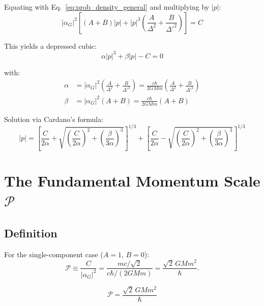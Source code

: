 \documentclass[11pt,a4paper]{article}
\theoremstyle{definition}
\theoremstyle{remark}
\begin{document}
	Equating with Eq.~\eqref{eq:prob_density_general} and multiplying by $|p|$:
	\begin{equation}
		|\alpha_G|^2\!\left[(A+B)|p| + |p|^3\!\left(\frac{A}{\Delta^2}+\frac{B}{\Delta'^2}\right)\right] = C
	\end{equation}
	
	This yields a depressed cubic:
	\begin{equation}
		\boxed{\alpha|p|^3 + \beta|p| - C = 0}
		\label{eq:cubic_momentum}
	\end{equation}
	
	with:
	\begin{align}
		\alpha &= |\alpha_G|^2\!\left(\frac{A}{\Delta^2}+\frac{B}{\Delta'^2}\right) = \frac{c\hbar}{2GMm}\!\left(\frac{A}{\Delta^2}+\frac{B}{\Delta'^2}\right) \label{eq:alpha_coeff}\\
		\beta  &= |\alpha_G|^2(A+B) = \frac{c\hbar}{2GMm}(A+B) \label{eq:beta_coeff}
	\end{align}
	
	Solution via Cardano's formula:
	\begin{equation}
		|p| = \left[\frac{C}{2\alpha}+\sqrt{\left(\frac{C}{2\alpha}\right)^2+\left(\frac{\beta}{3\alpha}\right)^3}\right]^{1/3}
		+ \left[\frac{C}{2\alpha}-\sqrt{\left(\frac{C}{2\alpha}\right)^2+\left(\frac{\beta}{3\alpha}\right)^3}\right]^{1/3}
		\label{eq:cardano_solution}
	\end{equation}
	
	\section{The Fundamental Momentum Scale $\mathcal{P}$}
	
	\subsection{Definition}
	
	For the single-component case ($A=1$, $B=0$):
	\begin{equation}
		\mathcal{P} \equiv \frac{C}{|\alpha_G|^2} = \frac{mc/\sqrt{2}}{c\hbar/(2GMm)} = \frac{\sqrt{2}\,GMm^2}{\hbar}.
	\end{equation}
	
	\begin{equation}
		\boxed{\mathcal{P} = \frac{\sqrt{2}\,GMm^2}{\hbar}}
		\label{eq:B_final}
	\end{equation}
	
\end{document}
